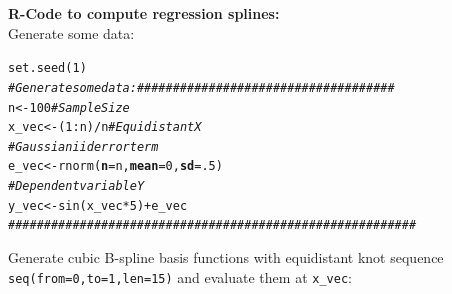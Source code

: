 \documentclass[14pt]{extreport}\usepackage[]{graphicx}\usepackage[]{xcolor}
\makeatletter
\newcommand{\hlnum}[1]{\textcolor[rgb]{0.69,0.494,0}{#1}}%
\newcommand{\hlcom}[1]{\textcolor[rgb]{0.514,0.506,0.514}{\textit{#1}}}%
\newcommand{\hlopt}[1]{\textcolor[rgb]{0,0,0}{#1}}%
\newcommand{\hlstd}[1]{\textcolor[rgb]{0,0,0}{#1}}%
\newcommand{\hlkwb}[1]{\textcolor[rgb]{0,0.341,0.682}{#1}}%
\newcommand{\hlkwc}[1]{\textcolor[rgb]{0,0,0}{\textbf{#1}}}%
\newcommand{\hlkwd}[1]{\textcolor[rgb]{0.004,0.004,0.506}{#1}}%
\newenvironment{kframe}{%
 \def\at@end@of@kframe{}%
 \ifinner\ifhmode%
  \def\at@end@of@kframe{\end{minipage}}%
  \begin{minipage}{\columnwidth}%
 \fi\fi%
 \def\FrameCommand##1{\hskip\@totalleftmargin \hskip-\fboxsep
 \colorbox{shadecolor}{##1}\hskip-\fboxsep
     \hskip-\linewidth \hskip-\@totalleftmargin \hskip\columnwidth}%
 \MakeFramed {\advance\hsize-\width
   \@totalleftmargin\z@ \linewidth\hsize
   \@setminipage}}%
 {\par\unskip\endMakeFramed%
 \at@end@of@kframe}
\newenvironment{knitrout}{}{} %
\makeatother
\begin{document}
\textbf{R-Code to compute regression splines:}\\
Generate some data:
\begin{knitrout}
\color{fgcolor}\begin{kframe}
\begin{alltt}
\hlkwd{set.seed}\hlstd{(}\hlnum{1}\hlstd{)}
\hlcom{# Generate some data: ####################################}
\hlstd{n}      \hlkwb{<-} \hlnum{100}     \hlcom{# Sample Size}
\hlstd{x_vec}  \hlkwb{<-} \hlstd{(}\hlnum{1}\hlopt{:}\hlstd{n)}\hlopt{/}\hlstd{n} \hlcom{# Equidistant X }
\hlcom{# Gaussian iid error term }
\hlstd{e_vec}  \hlkwb{<-} \hlkwd{rnorm}\hlstd{(}\hlkwc{n} \hlstd{= n,} \hlkwc{mean} \hlstd{=} \hlnum{0}\hlstd{,} \hlkwc{sd} \hlstd{=} \hlnum{.5}\hlstd{)}
\hlcom{# Dependent variable Y}
\hlstd{y_vec}  \hlkwb{<-}  \hlkwd{sin}\hlstd{(x_vec} \hlopt{*} \hlnum{5}\hlstd{)} \hlopt{+} \hlstd{e_vec}
\hlcom{#########################################################}
\end{alltt}
\end{kframe}
\end{knitrout}
Generate cubic B-spline basis functions with equidistant knot sequence \texttt{seq(from=0,to=1,len=15)} and evaluate them at \texttt{x\_vec}:%
\end{document}
